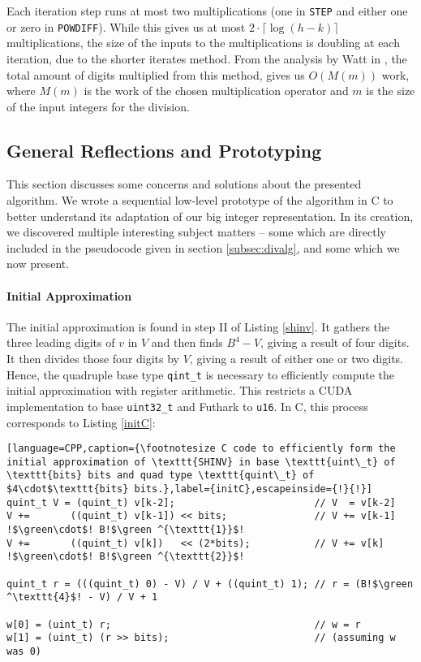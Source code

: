 Each iteration step runs at most two multiplications (one in \texttt{STEP} and
either one or zero in \texttt{POWDIFF}). While this gives us at most
$2 \cdot \lceil \log (h-k) \rceil$ multiplications, the size of the inputs to the
multiplications is doubling at each iteration, due to the shorter iterates
method. From the analysis by Watt in \cite{watt2023efficient}, the total amount
of digits multiplied from this method, gives us $O(M(m))$ work, where $M(m)$ is
the work of the chosen multiplication operator and $m$ is the size of the input
integers for the division.

\pagebreak

\subsection{General Reflections and Prototyping}
\label{subsec:divproto}

This section discusses some concerns and solutions about the presented
algorithm. We wrote a sequential low-level prototype of the algorithm in C to
better understand its adaptation of our big integer representation. In its
creation, we discovered multiple interesting subject matters -- some which are
directly included in the pseudocode given in section \ref{subsec:divalg}, and
some which we now present.

\paragraph{Initial Approximation}
The initial approximation is found in step II of Listing \ref{shinv}. It gathers
the three leading digits of $v$ in $V$ and then finds $B^4-V$, giving a result
of four digits. It then divides those four digits by $V$, giving a result of
either one or two digits. Hence, the quadruple base type \texttt{qint\_t} is
necessary to efficiently compute the initial approximation with register
arithmetic. This restricts a CUDA implementation to base \texttt{uint32\_t} and
Futhark to \texttt{u16}. In C, this process corresponds to Listing \ref{initC}:
\begin{lstlisting}[language=CPP,caption={\footnotesize C code to efficiently form the initial approximation of \texttt{SHINV} in base \texttt{uint\_t} of \texttt{bits} bits and quad type \texttt{quint\_t} of $4\cdot$\texttt{bits} bits.},label={initC},escapeinside={!}{!}]
quint_t V = (quint_t) v[k-2];                        // V  = v[k-2]
V +=       ((quint_t) v[k-1]) << bits;               // V += v[k-1] !$\green\cdot$! B!$\green ^{\texttt{1}}$!
V +=       ((quint_t) v[k])   << (2*bits);           // V += v[k]   !$\green\cdot$! B!$\green ^{\texttt{2}}$!

quint_t r = (((quint_t) 0) - V) / V + ((quint_t) 1); // r = (B!$\green ^\texttt{4}$! - V) / V + 1

w[0] = (uint_t) r;                                   // w = r 
w[1] = (uint_t) (r >> bits);                         // (assuming w was 0)
\end{lstlisting}

